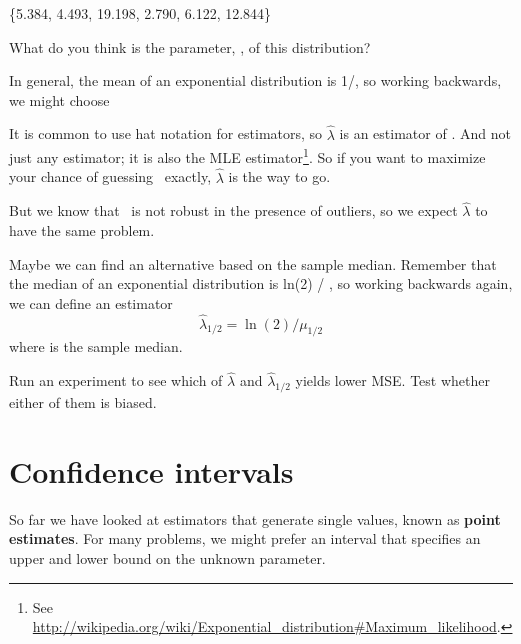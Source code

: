 \documentclass[12pt]{book}
\begin{document}
\{5.384, 4.493, 19.198, 2.790, 6.122, 12.844\}

What do you think is the parameter, \mylambda, of this distribution?

\newcommand{\lamhat}{\hat{\lambda}}
\newcommand{\lamhatmed}{\hat{\lambda}_{1/2}}

In general, the mean of an exponential distribution is 1/\mylambda,
so working backwards, we might choose

\Eqn{ $\lamhat$ = 1 / \myxbar }

It is common to use hat notation for estimators, so $\lamhat$ is an
estimator of \mylambda.  And not just any estimator; it is also the
MLE estimator\footnote{See
\url{http://wikipedia.org/wiki/Exponential_distribution#Maximum_likelihood}.}.
So if you want to maximize your chance of guessing \mylambda~exactly,
$\lamhat$ is the way to go.

But we know that \myxbar~is not robust in the presence of outliers, so
we expect $\lamhat$ to have the same problem.

Maybe we can find an alternative based on the sample median.  Remember
that the median of an exponential distribution is ln(2) / \mylambda,
so working backwards again, we can define an estimator
%
\[ \lamhatmed = \ln(2) / \mu_{1/2} \]
%
where \mymu {} is the sample median.

\begin{exercise}
Run an experiment to see which of $\lamhat$ and $\lamhatmed$ yields
lower MSE.  Test whether either of them is biased.


\end{exercise}


\section{Confidence intervals}

So far we have looked at estimators that generate single values, known
as {\bf point estimates}.  For many problems, we might prefer an interval
that specifies an upper and lower bound on the unknown parameter.
\end{document}
